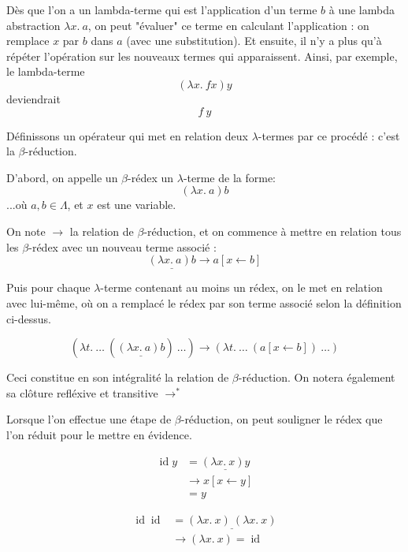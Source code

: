 \documentclass[11pt]{article}
\begin{document}
Dès que l'on a un lambda-terme qui est l'application d'un terme $b$ à une lambda abstraction $\lambda x.~a$, on peut "évaluer" ce terme en calculant l'application : on remplace $x$ par $b$ dans $a$ (avec une substitution). Et ensuite, il n'y a plus qu'à répéter l'opération sur les nouveaux termes qui apparaissent. Ainsi, par exemple, le lambda-terme
$$\left(\lambda x.~f x\right) y$$
deviendrait
$$f~y$$

Définissons un opérateur qui met en relation deux $\lambda$-termes par ce procédé : c'est la $\beta$-réduction.

\begin{definition}
D'abord, on appelle un $\beta$-rédex un $\lambda$-terme de la forme: 
$$\left(\lambda x.~a\right) b$$
...où $a, b\in\Lambda$, et $x$ est une variable.

On note $\longrightarrow$ la relation de $\beta$-réduction, et on commence à mettre en relation tous les $\beta$-rédex avec un nouveau terme associé :
$$\underline{\left(\lambda x.~a\right) b} \longrightarrow a\left[x\leftarrow b\right]$$

Puis pour chaque $\lambda$-terme contenant au moins un rédex, on le met en relation avec lui-même, où on a remplacé le rédex par son terme associé selon la définition ci-dessus.

$$\left(\lambda t.~\dots~\left(\underline{\left(\lambda x.~a\right) b}\right)~\dots \right) \longrightarrow \left(\lambda t.~\dots~\left(a\left[x\leftarrow b\right]\right)~\dots \right)$$

Ceci constitue en son intégralité la relation de $\beta$-réduction. On notera également sa clôture refléxive et transitive $\longrightarrow^*$
\end{definition}

\begin{remark}
    Lorsque l'on effectue une étape de $\beta$-réduction, on peut souligner le rédex que l'on réduit pour le mettre en évidence.
\end{remark}

\begin{example}
    \begin{equation*}
    \begin{aligned}
    \operatorname{id} y &= \underline{\left(\lambda x.~x\right) y}\\
    &\longrightarrow x\left[x\leftarrow y\right]\\
    &=y
    \end{aligned}
    \end{equation*}
    
    \begin{equation*}
    \begin{aligned}
    \operatorname{id} \operatorname{id} &= \underline{\left(\lambda x.~x\right)~\left(\lambda x.~x\right)}\\
    &\longrightarrow \left(\lambda x.~x\right) = \operatorname{id}
    \end{aligned}
    \end{equation*}
\end{example}
\end{document}
